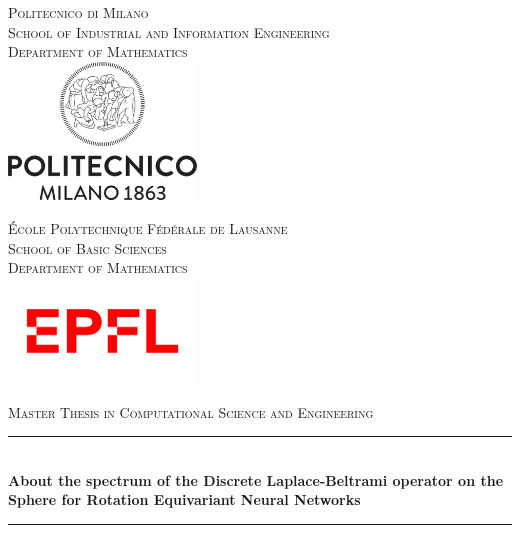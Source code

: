 
\begin{titlepage}
\newcommand{\HRule}{\rule{\linewidth}{1mm}} %
\begin{minipage}[t]{.49\textwidth}
	\raggedleft
	\center
	\textsc{\footnotesize Politecnico di Milano}\\
	\textsc{ \scriptsize School of Industrial and Information Engineering}\\
	\textsc{\scriptsize Department of Mathematics}\\[0.5cm]
	\includegraphics[width=5cm]{figs/cover/polimi.png}
\end{minipage}
\hfill
%
\begin{minipage}[t]{.49\textwidth}
	\raggedright
	\center
	\textsc{\footnotesize \'Ecole Polytechnique F\'ed\'erale de Lausanne}\\
	\textsc{\scriptsize School of Basic Sciences}\\
	\textsc{\scriptsize Department of Mathematics}\\[0.8cm]
	\includegraphics[width=5cm]{figs/cover/EPFL.jpg}
\end{minipage}
\center %
\vspace{2cm}





\textsc{\large Master Thesis in Computational Science and Engineering}\\[1.5cm]

\HRule \\[0.4cm]
{ \LARGE \bfseries About the spectrum of the Discrete Laplace-Beltrami operator on the Sphere for Rotation Equivariant Neural Networks}\\[0.4cm] 
\HRule \\[1.5cm]     
\vfill 


\end{titlepage}
